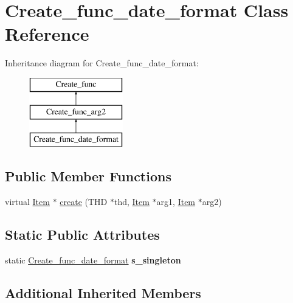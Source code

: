 \hypertarget{classCreate__func__date__format}{}\section{Create\+\_\+func\+\_\+date\+\_\+format Class Reference}
\label{classCreate__func__date__format}
Inheritance diagram for Create\+\_\+func\+\_\+date\+\_\+format\+:\begin{figure}[H]
\begin{center}
\leavevmode
\includegraphics[height=3.000000cm]{classCreate__func__date__format}
\end{center}
\end{figure}
\subsection*{Public Member Functions}
\begin{DoxyCompactItemize}
\item 
virtual \mbox{\hyperlink{classItem}{Item}} $\ast$ \mbox{\hyperlink{classCreate__func__date__format_a7ddf54877caaf07070cbf8804cdd0b6e}{create}} (T\+HD $\ast$thd, \mbox{\hyperlink{classItem}{Item}} $\ast$arg1, \mbox{\hyperlink{classItem}{Item}} $\ast$arg2)
\end{DoxyCompactItemize}
\subsection*{Static Public Attributes}
\begin{DoxyCompactItemize}
\item 
\mbox{\label{classCreate__func__date__format_a088370f43daf74b3d76d5cdcff7e606d}} 
static \mbox{\hyperlink{classCreate__func__date__format}{Create\+\_\+func\+\_\+date\+\_\+format}} {\bfseries s\+\_\+singleton}
\end{DoxyCompactItemize}
\subsection*{Additional Inherited Members}


